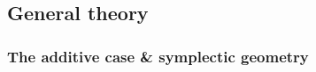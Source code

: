 \documentclass[notitlepage]{article}
\begin{document}
%
%
%
%

\subsection{General theory}
\label{sec:general_theory}

\subsubsection{The additive case \& symplectic geometry}
\end{document}
